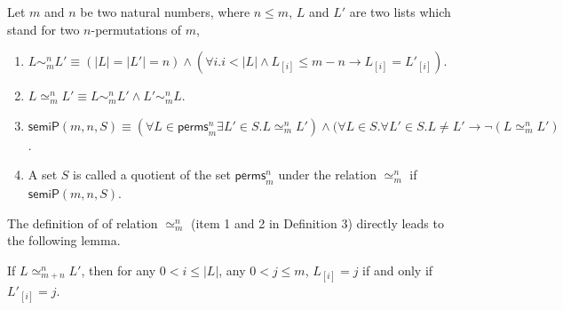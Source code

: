 \documentclass[final]{IEEEtran}
\newcommand\cai[1]{\textcolor{blue}{ #1} }
\newcommand\caicomment[1]{\textcolor{red}{comment: #1} }
\begin{document}
\begin{definition}
Let $m$ and $n$ be two natural numbers, where $n \le m$,  $L$ and $L'$ are two lists which stand for two  $n$-permutations of $m$,
\begin{enumerate}
\item
$L \sim_m^n L' \equiv (|L| =|L'|=n) \wedge (\forall i. i<|L| \wedge L_{[i]} \le m-n \longrightarrow L_{[i]}=L'_{[i]}) $.

\item $L \simeq_m^n L' \equiv L \sim_m^n L' \wedge   L' \sim_m^n L$.


\item $\mathsf{semiP}(m,n,S)\equiv (\forall  L \in \mathsf{perms}_{m}^{n} \exists  L' \in S. L \simeq_m^n L' ) \wedge (\forall  L\in S. \forall L'\in S. L \neq L' \longrightarrow \neg  (L \simeq_m^n L' )$.

\item    A set $S$ is called a quotient of the set $\mathsf{perms}_{m}^{n}$ under the relation $\simeq_m^n$ if    $\mathsf{semiP}(m,n,S)$.
\end{enumerate}
\end{definition}

The definition of of relation $\simeq_m^n$ (item 1 and 2 in Definition 3) directly leads to the following lemma. %




\begin{lemma}\label{lemma:simeq1}%
If $L \simeq_{m+n}^n L' $, then for any $0<i\le |L|$, any $0<j \le m$, $L_{[i]}=j$ if and only if $L'_{[i]}=j$.
\end{lemma}
\end{document}
